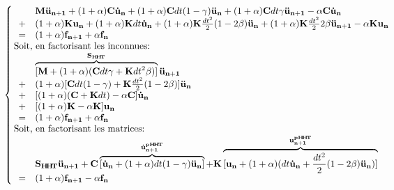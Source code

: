 \documentclass[12pt,a4paper]{report}
\begin{document}
\begin{equation}
	\!\!\!\!\!\!\!
	\left\{
	\!\!\!\!\!\!\!\!
	\begin{array}{l l l}
		\begin{array}{r c l}
			& &\mathbf{M}{\mathbf{\ddot{u}_{n+1}}} 
			+ (1+\alpha)\mathbf{C} {\mathbf{\dot{u}_n}}
			+ (1+\alpha)\mathbf{C} dt (1-\gamma){\mathbf{\ddot{u}_n}}
			+ (1+\alpha)\mathbf{C} dt \gamma {\mathbf{\ddot{u}_{n+1}}} 
			- \alpha \mathbf{C} \mathbf{\dot{u}_n}
			\\
			&+& (1+\alpha)\mathbf{K} \mathbf{u_n}
			+ (1+\alpha)\mathbf{K} dt \mathbf{\dot{u}_n}
			+ (1+\alpha)\mathbf{K} \frac{dt^2}{2} (1-2 \beta){\mathbf{\ddot{u}_n}}
			+ (1+\alpha)\mathbf{K} \frac{dt^2}{2} 2 \beta {\mathbf{\ddot{u}_{n+1}}}
			- \alpha \mathbf{K} \mathbf{u_n}
			\\
			&=& (1+\alpha)\mathbf{f_{n+1}}  + \alpha \mathbf{f_n}
		\end{array}
		\\
		~~~$Soit, en factorisant les inconnues:$
		\\
		\begin{array}{r c l}
			   & &\overbrace{
			   			[\mathbf{M} + (1+ \alpha)(\mathbf{C} dt \gamma 
			   								+ \mathbf{K} dt^2 \beta)] }^{\mathbf{S_{H\!H\!T}} }
			   		\mathbf{\ddot{u}_{n+1}}
			\\ &+&(1+ \alpha)[\mathbf{C} dt (1- \gamma) + \mathbf{K} \frac{dt^2}{2} (1-2\beta)] 					\mathbf{\ddot{u}_n}
			\\ &+&[(1+ \alpha) (\mathbf{C} + \mathbf{K} dt)-\alpha \mathbf{C}] \mathbf{\dot{u}_n}
			\\ &+&[(1+ \alpha) \mathbf{K} -\alpha \mathbf{K}] \mathbf{u_n}
			
			\\ &=& (1+\alpha)\mathbf{f_{n+1}}  + \alpha \mathbf{f_n}
		\end{array}
		\\
		~~~$Soit, en factorisant les matrices:$
		\\
		\begin{array}{r c l}
			   & &\mathbf{S_{H\!H\!T} } \mathbf{\ddot{u}_{n+1}} 
			+\mathbf{C}\overbrace	{
						[\mathbf{\dot{u}_n} + (1+\alpha) dt (1-\gamma) \mathbf{\ddot{u}_n}]
					}
					^{\mathbf{\dot{u}_{n+1}^{\mathbf{p}H\!H\!T} }}			
			+\mathbf{K}\overbrace	{
						[\mathbf{u_n} + (1+ \alpha)( dt \mathbf{\dot{u}_n} 
						 + \frac{dt^2}{2} (1-2\beta) \mathbf{\ddot{u}_n})]
					}
					^{\mathbf{u_{n+1}^{pH\!H\!T} }}
			\\ &=& (1+\alpha)\mathbf{f_{n+1}}  - \alpha \mathbf{f_n}
		\end{array}
	\end{array}
	\right.
	\!\!\!\!\!\!\!\!\!\!\!\!\!\!\!\!\!\!\!\!\!\!
\end{equation}
\end{document}
